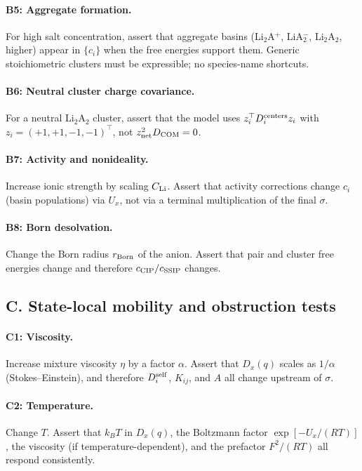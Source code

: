 \documentclass[11pt]{article}
\begin{document}
\paragraph{B5: Aggregate formation.}
For high salt concentration, assert that aggregate basins (Li$_2$A$^+$,
LiA$_2^-$, Li$_2$A$_2$, higher) appear in \(\{c_i\}\) when the free energies
support them.
Generic stoichiometric clusters must be expressible; no species-name shortcuts.

\paragraph{B6: Neutral cluster charge covariance.}
For a neutral Li$_2$A$_2$ cluster, assert that the model uses
\(z_i^\top D_i^{\rm centers}z_i\) with \(z_i=(+1,+1,-1,-1)^\top\),
not \(z_{\rm net}^2 D_{\rm COM}=0\).

\paragraph{B7: Activity and nonideality.}
Increase ionic strength by scaling \(C_{\rm Li}\). Assert that activity
corrections change \(c_i\) (basin populations) via \(U_x\), not via a terminal
multiplication of the final \(\sigma\).

\paragraph{B8: Born desolvation.}
Change the Born radius \(r_{\rm Born}\) of the anion. Assert that pair and
cluster free energies change and therefore \(c_{\rm CIP}/c_{\rm SSIP}\) changes.

\subsection{C. State-local mobility and obstruction tests}

\paragraph{C1: Viscosity.}
Increase mixture viscosity \(\eta\) by a factor \(\alpha\). Assert that
\(D_x(q)\) scales as \(1/\alpha\) (Stokes--Einstein), and therefore
\(D_i^{\rm self}\), \(K_{ij}\), and \(A\) all change upstream of \(\sigma\).

\paragraph{C2: Temperature.}
Change \(T\). Assert that \(k_BT\) in \(D_x(q)\), the Boltzmann factor
\(\exp[-U_x/(RT)]\), the viscosity (if temperature-dependent), and the
prefactor \(F^2/(RT)\) all respond consistently.
\end{document}
